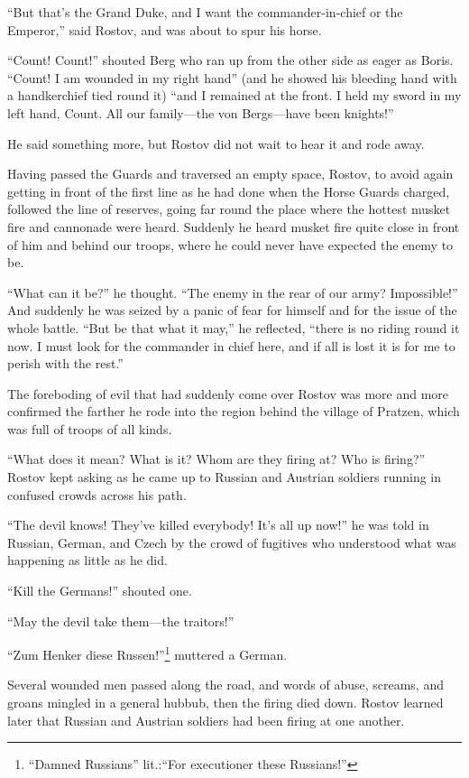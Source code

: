 ``But that's the Grand Duke, and I want the commander-in-chief or
the Emperor,'' said Rostov, and was about to spur his horse.

``Count! Count!'' shouted Berg who ran up from the other side as
eager as Boris. ``Count! I am wounded in my right hand'' (and he
showed his bleeding hand with a handkerchief tied round it) ``and
I remained at the front. I held my sword in my left hand,
Count. All our family---the von Bergs---have been knights!''

He said something more, but Rostov did not wait to hear it and
rode away.

Having passed the Guards and traversed an empty space, Rostov, to
avoid again getting in front of the first line as he had done
when the Horse Guards charged, followed the line of reserves,
going far round the place where the hottest musket fire and
cannonade were heard. Suddenly he heard musket fire quite close
in front of him and behind our troops, where he could never have
expected the enemy to be.

``What can it be?'' he thought. ``The enemy in the rear of our
army?  Impossible!'' And suddenly he was seized by a panic of
fear for himself and for the issue of the whole battle. ``But be
that what it may,'' he reflected, ``there is no riding round it
now. I must look for the commander in chief here, and if all is
lost it is for me to perish with the rest.''

The foreboding of evil that had suddenly come over Rostov was
more and more confirmed the farther he rode into the region
behind the village of Pratzen, which was full of troops of all
kinds.

``What does it mean? What is it? Whom are they firing at? Who is
firing?''  Rostov kept asking as he came up to Russian and
Austrian soldiers running in confused crowds across his path.

``The devil knows! They've killed everybody! It's all up now!''
he was told in Russian, German, and Czech by the crowd of
fugitives who understood what was happening as little as he did.

``Kill the Germans!'' shouted one.

``May the devil take them---the traitors!''

``Zum Henker diese Russen!''\footnote{``Damned Russians''
lit.:``For executioner these Russians!''} muttered a German.

Several wounded men passed along the road, and words of abuse,
screams, and groans mingled in a general hubbub, then the firing
died down.  Rostov learned later that Russian and Austrian
soldiers had been firing at one another.

